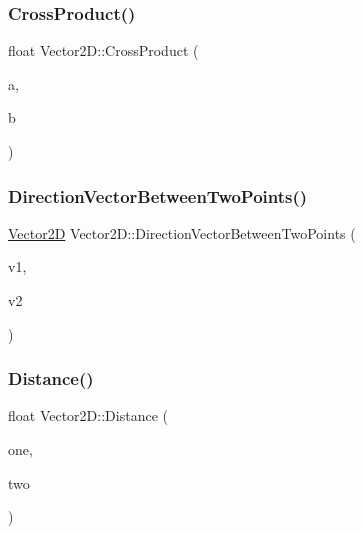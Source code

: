 \hypertarget{class_vector2_d_ad9557501f1291b4be24d940483754a4b}{}\label{class_vector2_d_ad9557501f1291b4be24d940483754a4b} 
\subsubsection{\texorpdfstring{Cross\+Product()}{CrossProduct()}}
{\footnotesize\ttfamily float Vector2\+D\+::\+Cross\+Product (\begin{DoxyParamCaption}\item[{const \hyperlink{class_vector2_d}{Vector2D} \&}]{a,  }\item[{const \hyperlink{class_vector2_d}{Vector2D} \&}]{b }\end{DoxyParamCaption})\hspace{0.3cm}{\ttfamily [static]}}

\hypertarget{class_vector2_d_a483b380a98091be25a4ac092eb42ee0f}{}\label{class_vector2_d_a483b380a98091be25a4ac092eb42ee0f} 
\subsubsection{\texorpdfstring{Direction\+Vector\+Between\+Two\+Points()}{DirectionVectorBetweenTwoPoints()}}
{\footnotesize\ttfamily \hyperlink{class_vector2_d}{Vector2D} Vector2\+D\+::\+Direction\+Vector\+Between\+Two\+Points (\begin{DoxyParamCaption}\item[{const \hyperlink{class_vector2_d}{Vector2D} \&}]{v1,  }\item[{const \hyperlink{class_vector2_d}{Vector2D} \&}]{v2 }\end{DoxyParamCaption})\hspace{0.3cm}{\ttfamily [static]}}

\hypertarget{class_vector2_d_a93592066c13a15a9f244ebccc04134ec}{}\label{class_vector2_d_a93592066c13a15a9f244ebccc04134ec} 
\subsubsection{\texorpdfstring{Distance()}{Distance()}}
{\footnotesize\ttfamily float Vector2\+D\+::\+Distance (\begin{DoxyParamCaption}\item[{\hyperlink{class_vector2_d}{Vector2D} \&}]{one,  }\item[{\hyperlink{class_vector2_d}{Vector2D} \&}]{two }\end{DoxyParamCaption})\hspace{0.3cm}{\ttfamily [static]}}

